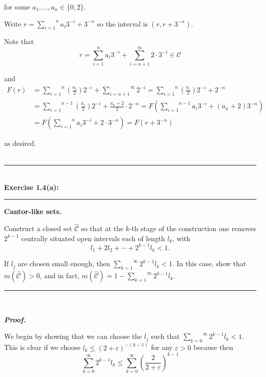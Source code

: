 \documentclass[a4paper,11pt]{article}
\begin{document}
for some $a_1, \dots, a_n \in \{0,2\}$.

Write $r = \overset{n}{\underset{i = 1}{\sum}} a_i3^{-i} + 3^{-n}$ so the interval is $(r, r + 3^{-n})$.

Note that
	$$r = \overset{n}{\underset{i = 1}{\sum}} a_i 3^{-i} + \overset{\infty}{\underset{i = n+1}{\sum}} 2 \cdot 3^{-i} \in \mathcal{C}$$

and
	$$\begin{aligned}
	F(r)
	&= \overset{n}{\underset{i = 1}{\sum}} \left( \frac{a_i}{2} \right) 2^{-i} + \overset{\infty}{\underset{i = n+1}{\sum}} 2^{-i}
	= \overset{n}{\underset{i = 1}{\sum}} \left( \frac{a_i}{2} \right) 2^{-i} + 2^{-n}\\
	&= \overset{n - 1}{\underset{i = 1}{\sum}} \left( \frac{a_i}{2} \right) 2^{-i} + \frac{a_n + 2}{2} \cdot 2^{-n}
	= F\left( \overset{n - 1}{\underset{i = 1}{\sum}} a_i 3^{-i} + (a_n + 2) 3^{-n} \right)\\
	&= F\left( \overset{n}{\underset{i = 1}{\sum}} a_i 3^{-i} + 2 \cdot 3^{-n} \right)
	= F(r + 3^{-n})
	\end{aligned}$$

as desired.\\\\


\begin{flushleft}
	\rule[-0.5ex]{17cm}{2pt}\\
		\textbf{Exercise 1.4(a):}\\
	\rule[1.5ex]{17cm}{0.5pt}
		\textbf{Cantor-like sets.}

		 Construct a closed set $\hat{\mathcal{C}}$ so that at the $k$-th stage of the construction one removes $2^{k-1}$ centrally situated open intervals each of length $l_k$, with
		 	$$l_1 + 2 l_2 + \cdots + 2^{k-1} l_k < 1.$$

		 If $l_j$ are chosen small enough, then $\overset{\infty}{\underset{k = 1}{\sum}} 2^{k-1} l_k < 1$.  In this case, show that $m(\hat{\mathcal{C}}) > 0$, and in fact, $m(\hat{\mathcal{C}}) = 1 - \overset{\infty}{\underset{k = 1}{\sum}} 2^{k-1} l_k$.
	\rule[1.0ex]{17cm}{0.5pt}\
\end{flushleft}

\textbf{\textit{Proof.}}

We begin by showing that we can choose the $l_j$ such that $\overset{\infty}{\underset{k = 0}{\sum}} 2^{k-1} l_k < 1$. This is clear if we choose $l_k \leq (2 + \varepsilon)^{-(k-1)}$ for any $\varepsilon > 0$ because then
	$$\overset{\infty}{\underset{k = 0}{\sum}} 2^{k-1} l_k
	\leq \overset{\infty}{\underset{k = 0}{\sum}} \left( \frac{2}{2 + \varepsilon} \right)^{k-1}$$
\end{document}
